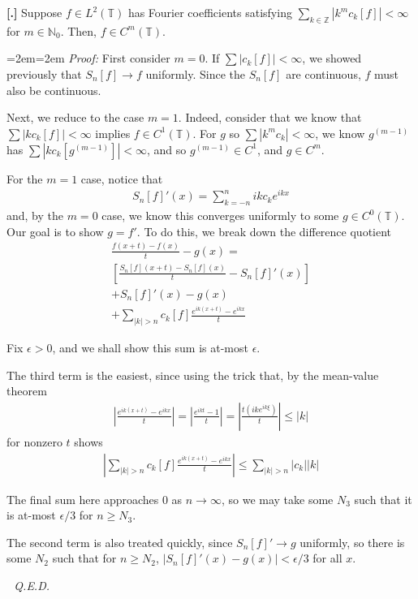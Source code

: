 \documentclass{article}
\newcommand{\N}{{\mathbb{N}}}
\newcommand{\Z}{{\mathbb{Z}}}
\newcommand{\bT}{\mathbb{T}}
\newcounter{result}[section]
\newenvironment{res}[1][]{\refstepcounter{result}\par\medskip
	\noindent \textbf{[\thesection.\theresult] #1} \rmfamily}{\medskip}
\newenvironment{pf}{%
	\par%
	\medskip
	\leftskip=2em\rightskip=2em%
	\noindent\ignorespaces \textit{Proof:} \newline}{%
	\,\, \newline \textit{Q.E.D.}\par\medskip}
\begin{document}
	\begin{res}
		Suppose $f \in L^{2}(\bT)$ has Fourier coefficients satisfying $\sum_{k \in \Z} |k^{m}c_{k}[f]| < \infty$ for $m \in \N_{0}$. Then, $f \in C^{m}(\bT)$. 
	\end{res}
	\begin{pf}
		First consider $m=0$. If $\sum |c_{k}[f]| < \infty$, we showed previously that $S_{n}[f] \to f$ uniformly. Since the $S_{n}[f]$ are continuous, $f$ must also be continuous. 
		
		Next, we reduce to the case $m=1$. Indeed, consider that we know that $\sum |kc_{k}[f]| < \infty$ implies $f \in C^{1}(\bT)$. For $g$ so $\sum |k^{m}c_{k}| < \infty$, we know $g^{(m-1)}$ has $\sum |kc_{k}[g^{(m-1)}]| < \infty$, and so $g^{(m-1)} \in C^{1}$, and $g \in C^{m}$. 
		
		For the $m=1$ case, notice that 
		\begin{align*}
			S_{n}[f]'(x) = \sum_{k=-n}^{n} ik c_{k} e^{ikx}
		\end{align*}
		and, by the $m=0$ case, we know this converges uniformly to some $g \in C^{0}(\bT)$. Our goal is to show $g = f'$. To do this, we break down the difference quotient
		\begin{align*}
			\frac{f(x+t)-f(x)}{t} - g(x) = \\
			\left[\frac{S_{n}[f](x+t) - S_{n}[f](x)}{t} - S_{n}[f]'(x) \right] \\
			+ S_{n}[f]'(x) - g(x)\\
			+ \sum_{|k| > n} c_{k}[f] \frac{e^{ik(x+t)} - e^{ikx}}{t}
		\end{align*}
		
		Fix $\epsilon > 0$, and we shall show this sum is at-most $\epsilon$. 
		
		The third term is the easiest, since using the trick that, by the mean-value theorem
		\begin{align*}
		 |\frac{e^{ik(x+t)} - e^{ikx}}{t}| = |\frac{e^{ikt} - 1}{t}| = |\frac{t(ik e^{ik\xi})}{t}| \leq |k|
		\end{align*}
		for nonzero $t$ shows
		\begin{align*}
			|\sum_{|k| > n} c_{k}[f] \frac{e^{ik(x+t)} - e^{ikx}}{t}| \leq \sum_{|k| >n} |c_{k}| |k|
		\end{align*}
		
		The final sum here approaches $0$ as $n \to \infty$, so we may take some $N_{3}$ such that it is at-most $\epsilon/3$ for $n \geq N_{3}$. 
		
		The second term is also treated quickly, since $S_{n}[f]' \to g$ uniformly, so there is some $N_{2}$ such that for $n \geq N_{2}$, $|S_{n}[f]'(x) - g(x)| < \epsilon/3$ for all $x$. 
		

\end{pf}
\end{document}
